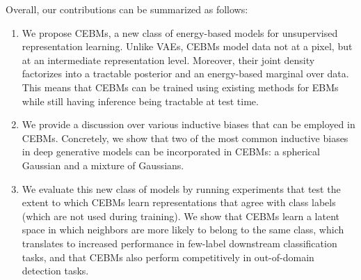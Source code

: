 \documentclass{article}
\begin{document}



Overall, our contributions can be summarized as follows:
\begin{enumerate}[noitemsep,topsep=0pt,parsep=6pt,partopsep=0pt]
    \item We propose CEBMs, a new class of energy-based models for unsupervised representation learning. Unlike VAEs, CEBMs model data not at a pixel, but at an intermediate representation level. Moreover, their joint density factorizes into a tractable posterior and an energy-based marginal over data. This means that CEBMs can be trained using existing methods for EBMs while still having inference being tractable at test time. 
    \item We provide a discussion over various inductive biases that can be employed in CEBMs. Concretely, we show that two of the most common inductive biases in deep generative models can be incorporated in CEBMs: a spherical Gaussian and a mixture of Gaussians. 
    \item We evaluate this new class of models by running experiments that test the extent to which CEBMs learn representations that agree with class labels (which are not used during training). We show that CEBMs learn a latent space in which neighbors are more likely to belong to the same class, which translates to increased performance in few-label downstream classification tasks, and that CEBMs also perform competitively in out-of-domain detection tasks.
\end{enumerate}





\end{document}
